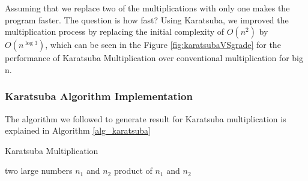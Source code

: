 \documentclass[12pt,journal,compsoc]{IEEEtran}
\begin{document}
Assuming that we replace two of the multiplications with only one makes the program faster. The question is how fast? Using Karatsuba, we improved the multiplication process by replacing the initial complexity of $O(n^{2})$ by $O(n^{\log 3})$, which can be seen in the Figure \ref{fig:karatsubaVSgrade} for the performance of Karatsuba Multiplication over conventional multiplication for big n.


\subsubsection{\bf Karatsuba Algorithm Implementation}

The algorithm we followed to generate result for Karatsuba multiplication is explained in Algorithm \ref{alg_karatsuba}
\begin{algorithm}                      %
\caption{Karatsuba Multiplication}          %
\label{alg_karatsuba}                           %
\begin{algorithmic}                    %
    \REQUIRE two large numbers $n_1$ and $n_2$
    \ENSURE product of $n_1$ and $n_2$

    \ENDIF
    
    \ELSE
    \ENDIF
    
    
    
\end{algorithmic}
\end{algorithm}
%	
\end{document}

